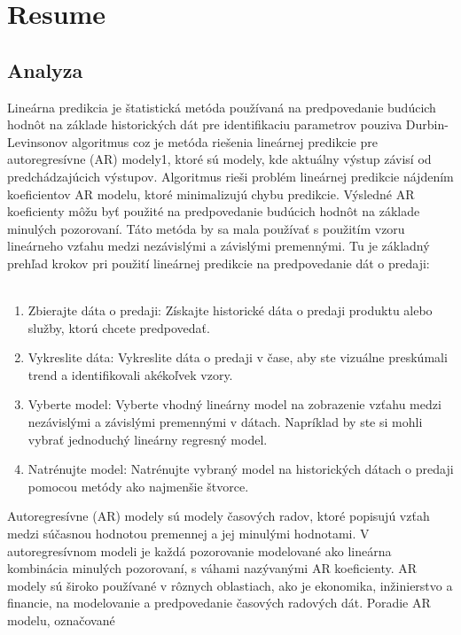 \chapter{Resume} \label{resume}
    \section{Analyza} \label{sk:analytic}
    Lineárna predikcia je štatistická metóda používaná na predpovedanie budúcich hodnôt na základe historických dát pre
    identifikaciu parametrov pouziva Durbin-Levinsonov algoritmus coz je metóda riešenia lineárnej predikcie pre
    autoregresívne (AR) modely1, ktoré sú modely, kde aktuálny výstup závisí od predchádzajúcich výstupov. Algoritmus
    rieši problém lineárnej predikcie nájdením koeficientov AR modelu, ktoré minimalizujú chybu predikcie. Výsledné AR
    koeficienty môžu byť použité na predpovedanie budúcich hodnôt na základe minulých pozorovaní. Táto metóda by sa mala
    používať s použitím vzoru lineárneho vzťahu medzi nezávislými a závislými premennými. Tu je základný prehľad krokov
    pri použití lineárnej predikcie na predpovedanie dát o predaji:\\
    \\
    \begin{enumerate}
        \item Zbierajte dáta o predaji: Získajte historické dáta o predaji produktu alebo služby, ktorú chcete predpovedať.
        \item Vykreslite dáta: Vykreslite dáta o predaji v čase, aby ste vizuálne preskúmali trend a identifikovali
        akékoľvek vzory.
        \item Vyberte model: Vyberte vhodný lineárny model na zobrazenie vzťahu medzi nezávislými a závislými
        premennými v dátach. Napríklad by ste si mohli vybrať jednoduchý lineárny regresný model.
        \item Natrénujte model: Natrénujte vybraný model na historických dátach o predaji pomocou metódy ako najmenšie štvorce.
    \end{enumerate}
    Autoregresívne (AR) modely sú modely časových radov, ktoré popisujú vzťah medzi súčasnou hodnotou premennej a jej
    minulými hodnotami. V autoregresívnom modeli je každá pozorovanie modelované ako lineárna kombinácia minulých
    pozorovaní, s váhami nazývanými AR koeficienty. AR modely sú široko používané v rôznych oblastiach, ako je ekonomika,
    inžinierstvo a financie, na modelovanie a predpovedanie časových radových dát. Poradie AR modelu, označované
